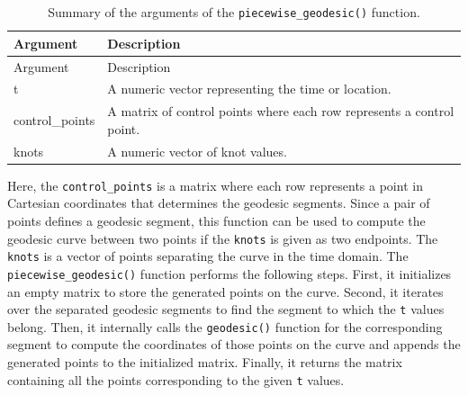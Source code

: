 \begin{longtable}[]{@{}
  >{\raggedright\arraybackslash}p{}
  >{\raggedright\arraybackslash}p{}@{}}
\caption{\label{tab:piecewisegeodesic} Summary of the arguments of the \texttt{piecewise\_geodesic()} function.}\tabularnewline
\toprule\noalign{}
\begin{minipage}[b]{\linewidth}\raggedright
Argument
\end{minipage} & \begin{minipage}[b]{\linewidth}\raggedright
Description
\end{minipage} \\
\midrule\noalign{}
\endfirsthead
\toprule\noalign{}
\begin{minipage}[b]{\linewidth}\raggedright
Argument
\end{minipage} & \begin{minipage}[b]{\linewidth}\raggedright
Description
\end{minipage} \\
\midrule\noalign{}
\endhead
\bottomrule\noalign{}
\endlastfoot
t & A numeric vector representing the time or location. \\
control\_points & A matrix of control points where each row represents a control point. \\
knots & A numeric vector of knot values. \\
\end{longtable}

Here, the \texttt{control\_points} is a matrix where each row represents a point in Cartesian coordinates that determines the geodesic segments. Since a pair of points defines a geodesic segment, this function can be used to compute the geodesic curve between two points if the \texttt{knots} is given as two endpoints. The \texttt{knots} is a vector of points separating the curve in the time domain. The \texttt{piecewise\_geodesic()} function performs the following steps. First, it initializes an empty matrix to store the generated points on the curve. Second, it iterates over the separated geodesic segments to find the segment to which the \texttt{t} values belong. Then, it internally calls the \texttt{geodesic()} function for the corresponding segment to compute the coordinates of those points on the curve and appends the generated points to the initialized matrix. Finally, it returns the matrix containing all the points corresponding to the given \texttt{t} values.

